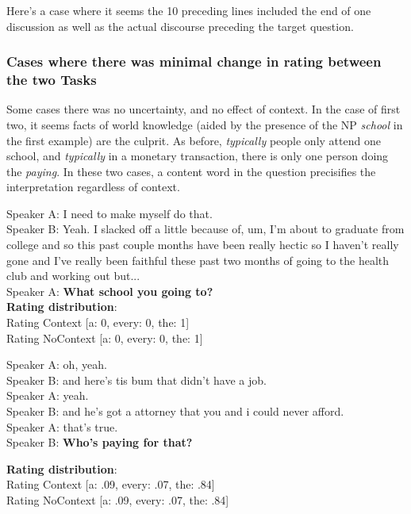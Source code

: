 \documentclass[12pt,letterpaper,table,svgnames,dvipsnames]{article}
\begin{document}
Here's a case where it seems the 10 preceding lines included the end of one discussion as well as the actual discourse preceding the target question.



\subsubsection{Cases where there was minimal change in rating between the two Tasks}


Some cases there was no uncertainty, and no effect of context. In the case of first two, it seems facts of world knowledge (aided by the presence of the NP \emph{school} in the first example) are the culprit. As before, \emph{typically} people only attend one school, and \emph{typically} in a monetary transaction, there is only one person doing the \emph{paying}. In these two cases, a content word in the question precisifies the interpretation regardless of context.
\begin{exe}
\ex {}
    \begin{xlist}
    \ex {}
    Speaker A: I need to make myself do that.\\
    Speaker B: Yeah. I slacked off a little because of, um, I'm about to graduate from college and so this past couple months have been really hectic so I haven't really gone and I've really been faithful these past two months of going to the health club and working out but...\\
    Speaker A: \textbf{What school you going to?}\\
    
    \ex \textbf{Rating distribution}:\\
    Rating Context [a: 0, every: 0, the: 1]\\
    Rating NoContext [a: 0, every: 0, the: 1]
    \end{xlist}
\end{exe}

\begin{exe}
\ex {}
    \begin{xlist}
    \ex {}
    Speaker A: oh, yeah.\\
    Speaker B: and here's tis bum that didn't have a job.\\
    Speaker A: yeah.\\
    Speaker B: and he's got a attorney that you and i could never afford.\\
    Speaker A: that's true.\\
    Speaker B: \textbf{Who's paying for that?}
    
    \ex \textbf{Rating distribution}:\\
    Rating Context [a: .09, every: .07, the: .84]\\
    Rating NoContext [a: .09, every: .07, the: .84] 
    \end{xlist}
\end{exe}
\end{document}

